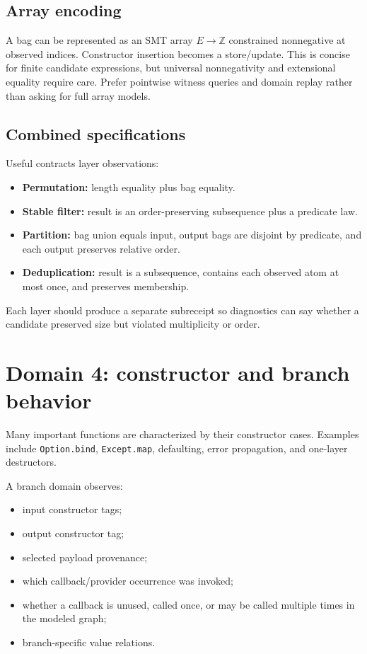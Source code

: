 \documentclass[11pt,oneside]{report}
\newcommand{\code}[1]{\texttt{#1}}
\begin{document}
\subsection{Array encoding}

A bag can be represented as an SMT array $E\to\mathbb{Z}$ constrained nonnegative at observed indices. Constructor insertion becomes a store/update. This is concise for finite candidate expressions, but universal nonnegativity and extensional equality require care. Prefer pointwise witness queries and domain replay rather than asking for full array models.

\subsection{Combined specifications}

Useful contracts layer observations:

\begin{itemize}[leftmargin=2em]
\item \textbf{Permutation:} length equality plus bag equality.
\item \textbf{Stable filter:} result is an order-preserving subsequence plus a predicate law.
\item \textbf{Partition:} bag union equals input, output bags are disjoint by predicate, and each output preserves relative order.
\item \textbf{Deduplication:} result is a subsequence, contains each observed atom at most once, and preserves membership.
\end{itemize}

Each layer should produce a separate subreceipt so diagnostics can say whether a candidate preserved size but violated multiplicity or order.

\section{Domain 4: constructor and branch behavior}
\label{sec:domain-branch}

Many important functions are characterized by their constructor cases. Examples include \code{Option.bind}, \code{Except.map}, defaulting, error propagation, and one-layer destructors.

A branch domain observes:

\begin{itemize}[leftmargin=2em]
\item input constructor tags;
\item output constructor tag;
\item selected payload provenance;
\item which callback/provider occurrence was invoked;
\item whether a callback is unused, called once, or may be called multiple times in the modeled graph;
\item branch-specific value relations.
\end{itemize}
\end{document}
